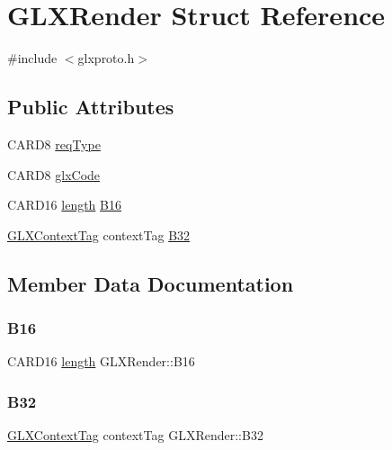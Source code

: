 \hypertarget{struct_g_l_x_render}{}\section{G\+L\+X\+Render Struct Reference}
\label{struct_g_l_x_render}


{\ttfamily \#include $<$glxproto.\+h$>$}

\subsection*{Public Attributes}
\begin{DoxyCompactItemize}
\item 
C\+A\+R\+D8 \hyperlink{struct_g_l_x_render_a815efd4037cdcaa5d01b627744901bf5}{req\+Type}
\item 
C\+A\+R\+D8 \hyperlink{struct_g_l_x_render_a3152a1c534f08e16a916f396ccf3e4ab}{glx\+Code}
\item 
C\+A\+R\+D16 \hyperlink{glcorearb_8h_ab9c919755bde3b34349e23a32b4e0fa7}{length} \hyperlink{struct_g_l_x_render_adb63572177e7725d9d93dabfd07904e5}{B16}
\item 
\hyperlink{glxproto_8h_ae71763ce00c9fa460beb4699af678691}{G\+L\+X\+Context\+Tag} context\+Tag \hyperlink{struct_g_l_x_render_a7b1f0815b9df9651fe2236baeff39de4}{B32}
\end{DoxyCompactItemize}


\subsection{Member Data Documentation}
\mbox{\label{struct_g_l_x_render_adb63572177e7725d9d93dabfd07904e5}} 
\subsubsection{\texorpdfstring{B16}{B16}}
{\footnotesize\ttfamily C\+A\+R\+D16 \hyperlink{glcorearb_8h_ab9c919755bde3b34349e23a32b4e0fa7}{length} G\+L\+X\+Render\+::\+B16}

\mbox{\label{struct_g_l_x_render_a7b1f0815b9df9651fe2236baeff39de4}} 
\subsubsection{\texorpdfstring{B32}{B32}}
{\footnotesize\ttfamily \hyperlink{glxproto_8h_ae71763ce00c9fa460beb4699af678691}{G\+L\+X\+Context\+Tag} context\+Tag G\+L\+X\+Render\+::\+B32}

